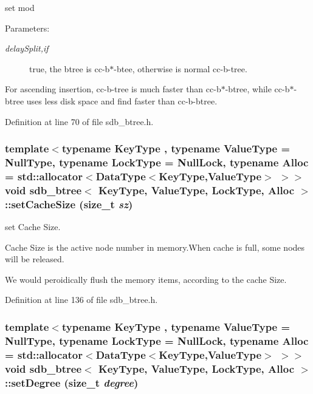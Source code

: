 set mod 

\begin{Desc}
\item[Parameters:]
\begin{description}
\item[{\em delaySplit,if}]true, the btree is cc-b$\ast$-btee, otherwise is normal cc-b-tree.\end{description}
\end{Desc}
For ascending insertion, cc-b-tree is much faster than cc-b$\ast$-btree, while cc-b$\ast$-btree uses less disk space and find faster than cc-b-btree. 

Definition at line 70 of file sdb\_\-btree.h.\hypertarget{classsdb__btree_a815f13cd8a7cf18a93190e6aa9c4efc}{
\subsubsection[{setCacheSize}]{\setlength{\rightskip}{0pt plus 5cm}template$<$typename KeyType , typename ValueType  = NullType, typename LockType  = NullLock, typename Alloc  = std::allocator$<$DataType$<$KeyType,ValueType$>$ $>$$>$ void {\bf sdb\_\-btree}$<$ KeyType, ValueType, LockType, Alloc $>$::setCacheSize (size\_\-t {\em sz})}}
\label{classsdb__btree_a815f13cd8a7cf18a93190e6aa9c4efc}


set Cache Size. 

Cache Size is the active node number in memory.When cache is full, some nodes will be released.

We would peroidically flush the memory items, according to the cache Size. 

Definition at line 136 of file sdb\_\-btree.h.\hypertarget{classsdb__btree_fc9d66b5f80ba33b114c5f4db70a8dc6}{
\subsubsection[{setDegree}]{\setlength{\rightskip}{0pt plus 5cm}template$<$typename KeyType , typename ValueType  = NullType, typename LockType  = NullLock, typename Alloc  = std::allocator$<$DataType$<$KeyType,ValueType$>$ $>$$>$ void {\bf sdb\_\-btree}$<$ KeyType, ValueType, LockType, Alloc $>$::setDegree (size\_\-t {\em degree})}}
\label{classsdb__btree_fc9d66b5f80ba33b114c5f4db70a8dc6}


